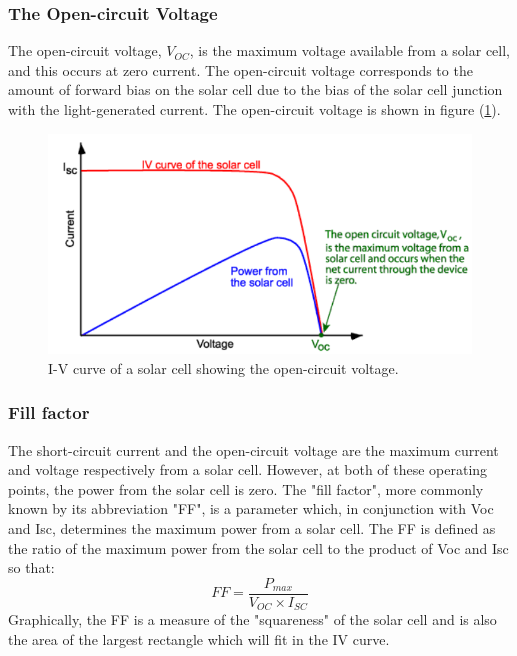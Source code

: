 \documentclass[%
 aip,
 amsmath,amssymb,
 reprint, floatfix%
]{revtex4-2}
\begin{document}
    \subsubsection{The Open-circuit Voltage}
        The open-circuit voltage, $V_{OC}$, is the maximum voltage available from a solar cell, and this occurs at zero current. The open-circuit voltage corresponds to the amount of forward bias on the solar cell due to the bias of the solar cell junction with the light-generated current. The open-circuit voltage is shown in figure (\ref{fig:open}).
        \begin{figure}
            \centering
            \includegraphics[scale = 0.61]{Figures/open-circuit.png}
            \caption{I-V curve of a solar cell showing the open-circuit voltage.}
            \label{fig:open}
        \end{figure}
    \subsubsection{Fill factor}
        The short-circuit current and the open-circuit voltage are the maximum current and voltage respectively from a solar cell. However, at both of these operating points, the power from the solar cell is zero. The "fill factor", more commonly known by its abbreviation "FF", is a parameter which, in conjunction with Voc and Isc, determines the maximum power from a solar cell. The FF is defined as the ratio of the maximum power from the solar cell to the product of Voc and Isc so that:
        \begin{equation}
            FF = \dfrac{P_{max}}{V_{OC} \times I_{SC}}
        \end{equation}
        Graphically, the FF is a measure of the "squareness" of the solar cell and is also the area of the largest rectangle which will fit in the IV curve.
\end{document}
